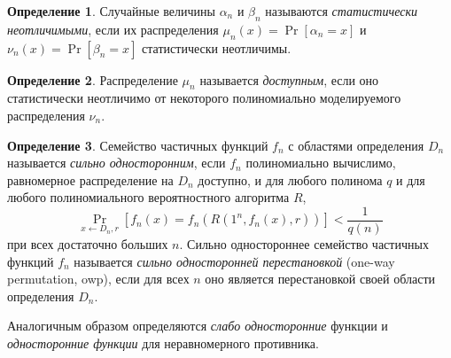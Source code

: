 \documentclass[12pt,a4paper]{article}
\theoremstyle{definition}
\newtheorem{definition}{Определение}[section]
\theoremstyle{plain}
\theoremstyle{remark}
\begin{document}
\begin{definition}
Случайные величины $\alpha_n$ и $\beta_n$ называются \emph{статистически
неотличимыми}, если их распределения $\mu_n(x) = \Pr[\alpha_n = x]$
и $\nu_n(x) = \Pr[\beta_n = x]$ статистически неотличимы.
\end{definition}

\begin{definition}
Распределение $\mu_n$ называется \emph{доступным}, если оно статистически
неотличимо от некоторого полиномиально моделируемого распределения $\nu_n$.
\end{definition}

\begin{definition}
Семейство частичных функций $f_n$ с областями определения $D_n$ называется 
\emph{сильно односторонним}, если $f_n$ полиномиально вычислимо, равномерное
распределение на $D_n$ доступно, и для любого полинома $q$ и для любого
полиномиального вероятностного алгоритма $R$,
$$\Pr_{x\gets D_n,r}[f_n(x) = f_n(R(1^n, f_n(x), r))] < \frac{1}{q(n)}$$
при всех достаточно больших $n$. Сильно одностороннее семейство частичных функций
$f_n$ называется \emph{сильно односторонней перестановкой} (one-way permutation, owp), 
если для всех $n$ оно является перестановкой своей области определения $D_n$.
\end{definition}
Аналогичным образом определяются \emph{слабо односторонние} функции и
\emph{односторонние функции} для неравномерного противника.
\end{document}
